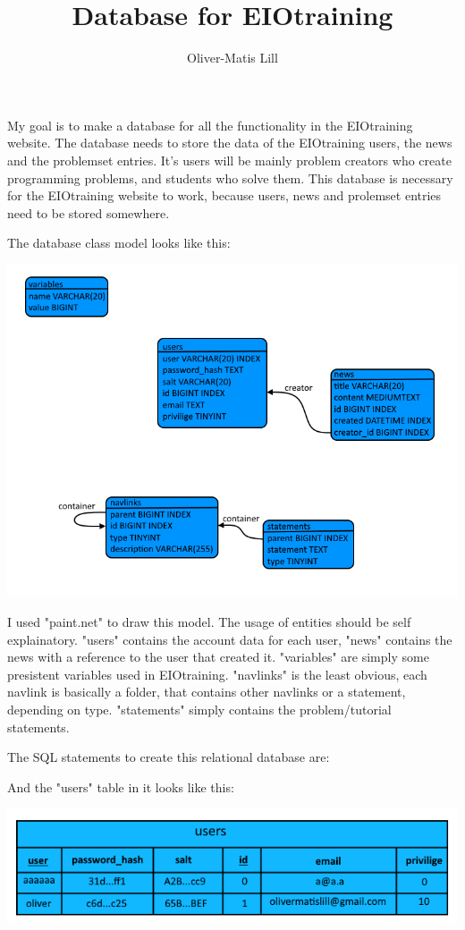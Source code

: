\documentclass{article}
\begin{document}
\lstset{language=SQL, tabsize=3, basicstyle=\footnotesize, columns=fullflexible, breaklines=true}

\title{Database for EIOtraining}
\author{Oliver-Matis Lill}
\maketitle


My goal is to make a database for all the functionality in the EIOtraining website. The database needs to store the data of the EIOtraining users, the news and the problemset entries. It's users will be mainly problem creators who create programming problems, and students who solve them. This database is necessary for the EIOtraining website to work, because users, news and prolemset entries need to be stored somewhere.

The database class model looks like this:
\begin{center}
\includegraphics[scale=0.65]{database.png}
\end{center}

I used "paint.net" to draw this model. The usage of entities should be self explainatory. "users" contains the account data for each user, "news" contains the news with a reference to the user that created it. "variables" are simply some presistent variables used in EIOtraining. "navlinks" is the least obvious, each navlink is basically a folder, that contains other navlinks or a statement, depending on type. "statements" simply contains the problem/tutorial statements.

The SQL statements to create this relational database are:

And the "users" table in it looks like this:
\begin{center}
\includegraphics[scale=0.65]{rel.png}
\end{center}
\end{document}
